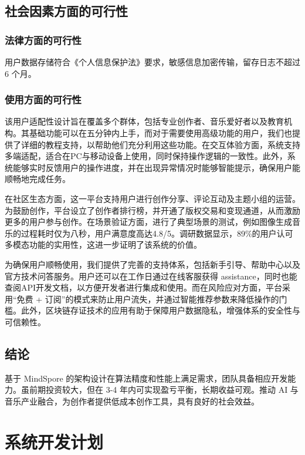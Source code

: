 \documentclass{base}
\numberwithin{figure}{section} %
\begin{document}
\subsection{社会因素方面的可行性}

\subsubsection{法律方面的可行性}

用户数据存储符合《个人信息保护法》要求，敏感信息加密传输，留存日志不超过 6 个月。

\subsubsection{使用方面的可行性}

该用户适配性设计旨在覆盖多个群体，包括专业创作者、音乐爱好者以及教育机构。其基础功能可以在五分钟内上手，而对于需要使用高级功能的用户，我们也提供了详细的教程支持，以帮助他们充分利用这些功能。在交互体验方面，系统支持多端适配，适合在PC与移动设备上使用，同时保持操作逻辑的一致性。此外，系统能够实时反馈用户的操作进度，并在出现异常情况时能够智能提示，确保用户能顺畅地完成任务。

在社区生态方面，这一平台支持用户进行创作分享、评论互动及主题小组的运营。为鼓励创作，平台设立了创作者排行榜，并开通了版权交易和变现通道，从而激励更多的用户参与创作。在场景验证方面，进行了典型场景的测试，例如图像生成音乐的过程耗时仅为八秒，用户满意度高达4.8/5。调研数据显示，89\%的用户认可多模态功能的实用性，这进一步证明了该系统的价值。

为确保用户顺畅使用，我们提供了完善的支持体系，包括新手引导、帮助中心以及官方技术问答服务。用户还可以在工作日通过在线客服获得 assistance，同时也能查阅API开发文档，以方便开发者进行集成和使用。而在风险应对方面，平台采用“免费 + 订阅”的模式来防止用户流失，并通过智能推荐参数来降低操作的门槛。此外，区块链存证技术的应用有助于保障用户数据隐私，增强体系的安全性与可信赖性。

\subsection{结论}

基于 MindSpore 的架构设计在算法精度和性能上满足需求，团队具备相应开发能力。虽前期投资较大，但在 3-4 年内可实现盈亏平衡，长期收益可观。推动 AI 与音乐产业融合，为创作者提供低成本创作工具，具有良好的社会效益。 
\newpage

\section{系统开发计划}
\end{document}
